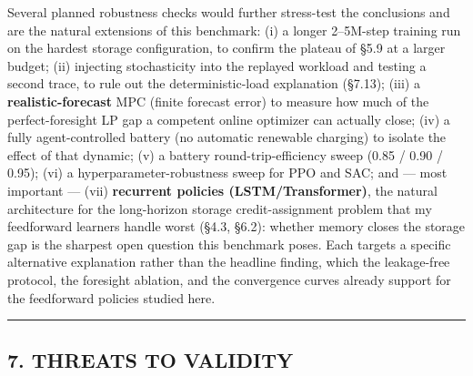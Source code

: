 \documentclass[
  11pt,
]{article}
\begin{document}
Several planned robustness checks would further stress-test the
conclusions and are the natural extensions of this benchmark: (i) a
longer 2--5M-step training run on the hardest storage configuration, to
confirm the plateau of §5.9 at a larger budget; (ii) injecting
stochasticity into the replayed workload and testing a second trace, to
rule out the deterministic-load explanation (§7.13); (iii) a
\textbf{realistic-forecast} MPC (finite forecast error) to measure how
much of the perfect-foresight LP gap a competent online optimizer can
actually close; (iv) a fully agent-controlled battery (no automatic
renewable charging) to isolate the effect of that dynamic; (v) a battery
round-trip-efficiency sweep (0.85 / 0.90 / 0.95); (vi) a
hyperparameter-robustness sweep for PPO and SAC; and --- most important
--- (vii) \textbf{recurrent policies (LSTM/Transformer)}, the natural
architecture for the long-horizon storage credit-assignment problem that
my feedforward learners handle worst (§4.3, §6.2): whether memory closes
the storage gap is the sharpest open question this benchmark poses. Each
targets a specific alternative explanation rather than the headline
finding, which the leakage-free protocol, the foresight ablation, and
the convergence curves already support for the feedforward policies
studied here.

\begin{center}\rule{0.5\linewidth}{0.5pt}\end{center}

\subsection{7. THREATS TO VALIDITY}\label{threats-to-validity}
\end{document}
